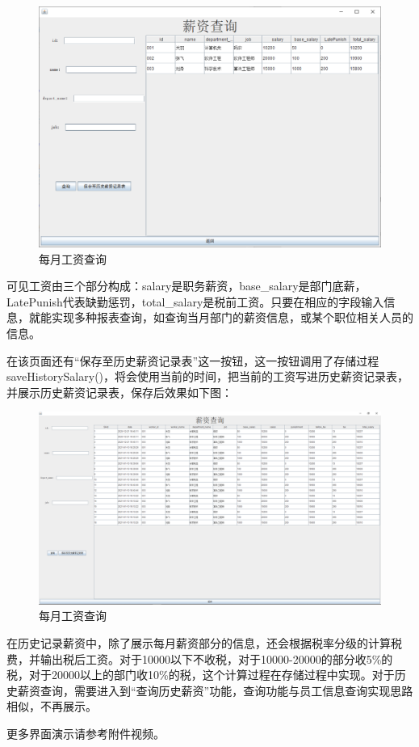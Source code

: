 \documentclass[withoutpreface,bwprint]{cumcmthesis} %
\begin{document}
\begin{figure}[H]
    \centering
    \includegraphics[width=1\linewidth]{salary}
    \caption{每月工资查询}
\end{figure}
可见工资由三个部分构成：salary是职务薪资，base\_salary是部门底薪，LatePunish代表缺勤惩罚，total\_salary是税前工资。只要在相应的字段输入信息，就能实现多种报表查询，如查询当月部门的薪资信息，或某个职位相关人员的信息。 \par
在该页面还有“保存至历史薪资记录表”这一按钮，这一按钮调用了存储过程saveHistorySalary()，将会使用当前的时间，把当前的工资写进历史薪资记录表，并展示历史薪资记录表，保存后效果如下图：
\begin{figure}[H]
    \centering
    \includegraphics[width=1\linewidth]{saveSalary}
    \caption{每月工资查询}
\end{figure}
在历史记录薪资中，除了展示每月薪资部分的信息，还会根据税率分级的计算税费，并输出税后工资。对于10000以下不收税，对于10000-20000的部分收5\%的税，对于20000以上的部门收10\%的税，这个计算过程在存储过程中实现。对于历史薪资查询，需要进入到“查询历史薪资”功能，查询功能与员工信息查询实现思路相似，不再展示。\par
更多界面演示请参考附件视频。
\end{document}
